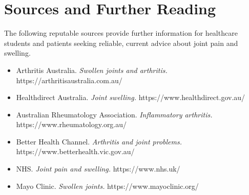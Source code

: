 \section*{Sources and Further Reading}
The following reputable sources provide further information for healthcare students and patients seeking reliable, current advice about joint pain and swelling.
\begin{itemize}
    \item Arthritis Australia. \textit{Swollen joints and arthritis.} https://arthritisaustralia.com.au/
    \item Healthdirect Australia. \textit{Joint swelling.} https://www.healthdirect.gov.au/
    \item Australian Rheumatology Association. \textit{Inflammatory arthritis.} https://www.rheumatology.org.au/
    \item Better Health Channel. \textit{Arthritis and joint problems.} https://www.betterhealth.vic.gov.au/
    \item NHS. \textit{Joint pain and swelling.} https://www.nhs.uk/
    \item Mayo Clinic. \textit{Swollen joints.} https://www.mayoclinic.org/
\end{itemize}
